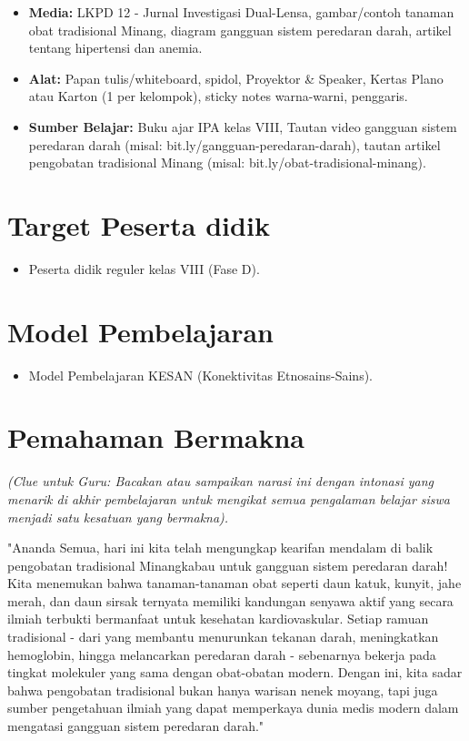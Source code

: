 \documentclass[a4paper,12pt]{article}
\begin{document}
\begin{itemize}
\item \textbf{Media:} LKPD 12 - Jurnal Investigasi Dual-Lensa, gambar/contoh tanaman obat tradisional Minang, diagram gangguan sistem peredaran darah, artikel tentang hipertensi dan anemia.
\item \textbf{Alat:} Papan tulis/whiteboard, spidol, Proyektor \& Speaker, Kertas Plano atau Karton (1 per kelompok), sticky notes warna-warni, penggaris.
\item \textbf{Sumber Belajar:} Buku ajar IPA kelas VIII, Tautan video gangguan sistem peredaran darah (misal: bit.ly/gangguan-peredaran-darah), tautan artikel pengobatan tradisional Minang (misal: bit.ly/obat-tradisional-minang).
\end{itemize}

\section{Target Peserta didik}

\begin{itemize}
\item Peserta didik reguler kelas VIII (Fase D).
\end{itemize}

\section{Model Pembelajaran}

\begin{itemize}
\item Model Pembelajaran KESAN (Konektivitas Etnosains-Sains).
\end{itemize}

\section{Pemahaman Bermakna}
\textit{(Clue untuk Guru: Bacakan atau sampaikan narasi ini dengan intonasi yang menarik di akhir pembelajaran untuk mengikat semua pengalaman belajar siswa menjadi satu kesatuan yang bermakna).}

\begin{tcolorbox}[sectionbox]
"Ananda Semua, hari ini kita telah mengungkap kearifan mendalam di balik pengobatan tradisional Minangkabau untuk gangguan sistem peredaran darah! Kita menemukan bahwa tanaman-tanaman obat seperti daun katuk, kunyit, jahe merah, dan daun sirsak ternyata memiliki kandungan senyawa aktif yang secara ilmiah terbukti bermanfaat untuk kesehatan kardiovaskular. Setiap ramuan tradisional - dari yang membantu menurunkan tekanan darah, meningkatkan hemoglobin, hingga melancarkan peredaran darah - sebenarnya bekerja pada tingkat molekuler yang sama dengan obat-obatan modern. Dengan ini, kita sadar bahwa pengobatan tradisional bukan hanya warisan nenek moyang, tapi juga sumber pengetahuan ilmiah yang dapat memperkaya dunia medis modern dalam mengatasi gangguan sistem peredaran darah."
\end{tcolorbox}
\end{document}
